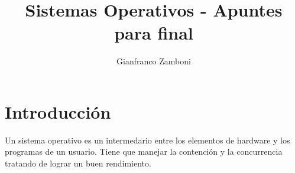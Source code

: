

\usepackage[style=nature,intitle=true,sorting=none]{biblatex}




\title{Sistemas Operativos - Apuntes para final}
\author{Gianfranco Zamboni}



\newcommand{\red}[1]{{\color{red}#1}}  			%


	\maketitle
	\tableofcontents

\newpage
\section{Introducción}

Un sistema operativo es un intermedario entre los elementos de hardware y los programas de un usuario. Tiene que manejar la contención y la concurrencia tratando de lograr un buen rendimiento.

